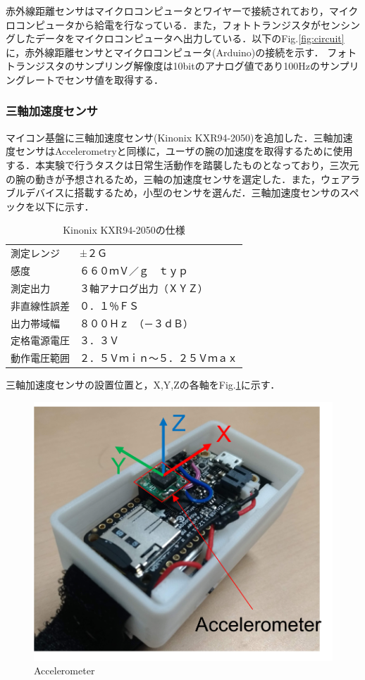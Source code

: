 赤外線距離センサはマイクロコンピュータとワイヤーで接続されており，マイクロコンピュータから給電を行なっている．また，フォトトランジスタがセンシングしたデータをマイクロコンピュータへ出力している．以下のFig.\ref{fig:circuit}に，赤外線距離センサとマイクロコンピュータ(Arduino)の接続を示す．
フォトトランジスタのサンプリング解像度は10bitのアナログ値であり100Hzのサンプリングレートでセンサ値を取得する．

\subsubsection*{三軸加速度センサ}
マイコン基盤に三軸加速度センサ(Kinonix KXR94-2050)を追加した．三軸加速度センサはAccelerometryと同様に，ユーザの腕の加速度を取得するために使用する．本実験で行うタスクは日常生活動作を踏襲したものとなっており，三次元の腕の動きが予想されるため，三軸の加速度センサを選定した．また，ウェアラブルデバイスに搭載するため，小型のセンサを選んだ．三軸加速度センサのスペックを以下に示す．

\begin{table}[H]
  \caption{Kinonix KXR94-2050の仕様}
  \centering
  \begin{tabular}{ll} 
    \hline \hline
測定レンジ&±２Ｇ\\
感度&６６０ｍＶ／ｇ　ｔｙｐ\\
測定出力&３軸アナログ出力（ＸＹＺ）\\
非直線性誤差&０．１％ＦＳ\\
出力帯域幅&８００Ｈｚ　（－３ｄＢ）\\
定格電源電圧&３．３Ｖ\\
動作電圧範囲&２．５Ｖｍｉｎ～５．２５Ｖｍａｘ\\
    \hline
  \end{tabular}
\end{table}

三軸加速度センサの設置位置と，X,Y,Zの各軸をFig.\ref{fig:accelerometer}に示す．

\begin{figure}[H]
  \centering
  \includegraphics[width=0.5\linewidth]{fig/accelerometer_1}
  \caption{Accelerometer}
  \label{fig:accelerometer}
\end{figure}

